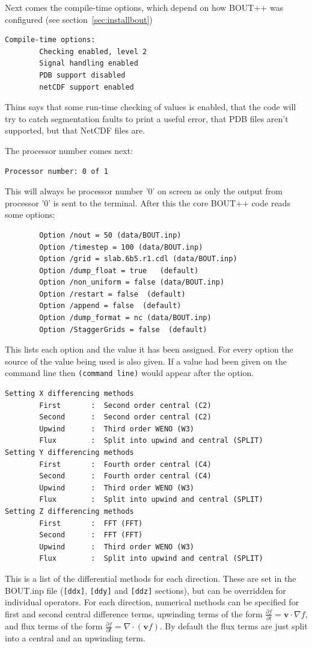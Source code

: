 \documentclass[12pt]{article}
\newcommand{\code}[1]{\texttt{#1}}
\newcommand{\ve}[1]{\ensuremath{\boldsymbol{#1}}}
\def\L{\left}
\def\R{\right}
\newcommand{\deriv}[2]{\ensuremath{\frac{\partial #1}{\partial #2}}}
\begin{document}
Next comes the compile-time options, which depend on how BOUT++ was configured
(see section~\ref{sec:installbout})
%
\begin{verbatim}
Compile-time options:
        Checking enabled, level 2
        Signal handling enabled
        PDB support disabled
        netCDF support enabled
\end{verbatim}
%
Thins says that some run-time checking of values is enabled, that the code will
try to catch segmentation faults to print a useful error, that PDB files aren't
supported, but that NetCDF files are.

The processor number comes next:
%
\begin{verbatim}
Processor number: 0 of 1
\end{verbatim}
%
This will always be processor number '0' on screen as only the output from
processor '0' is sent to the terminal. After this the core BOUT++ code reads
some options:
%
\begin{verbatim}
        Option /nout = 50 (data/BOUT.inp)
        Option /timestep = 100 (data/BOUT.inp)
        Option /grid = slab.6b5.r1.cdl (data/BOUT.inp)
        Option /dump_float = true   (default)
        Option /non_uniform = false (data/BOUT.inp)
        Option /restart = false  (default)
        Option /append = false  (default)
        Option /dump_format = nc (data/BOUT.inp)
        Option /StaggerGrids = false  (default)
\end{verbatim}
%
This lists each option and the value it has been assigned.  For every option
the source of the value being used is also given.  If a value had been given on
the command line then \texttt{(command line)} would appear after the option.

%
\begin{verbatim}
Setting X differencing methods
        First       :  Second order central (C2)
        Second      :  Second order central (C2)
        Upwind      :  Third order WENO (W3)
        Flux        :  Split into upwind and central (SPLIT)
Setting Y differencing methods
        First       :  Fourth order central (C4)
        Second      :  Fourth order central (C4)
        Upwind      :  Third order WENO (W3)
        Flux        :  Split into upwind and central (SPLIT)
Setting Z differencing methods
        First       :  FFT (FFT)
        Second      :  FFT (FFT)
        Upwind      :  Third order WENO (W3)
        Flux        :  Split into upwind and central (SPLIT)
\end{verbatim}
%
This is a list of the differential methods for each direction. These are set in
the BOUT.inp file (\code{[ddx]}, \code{[ddy]} and \code{[ddz]} sections), but
can be overridden for individual operators. For each direction, numerical
methods can be specified for first and second central difference terms,
upwinding terms of the form $\deriv{f}{t} = \ve{v}\cdot\nabla f$, and
flux terms of the form $\deriv{f}{t} = \nabla\cdot\L(\ve{v}f\R)$.
By default the flux terms are just split into a central and an upwinding term.
\end{document}
